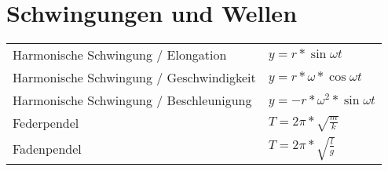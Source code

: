 \documentclass[12pt,a4paper]{paper}
\begin{document}
\section{Schwingungen und Wellen}
\begin{tabularx}{\textwidth}{X|X}
Harmonische Schwingung / Elongation & $y = r * \sin{\omega t}$\\
Harmonische Schwingung / Geschwindigkeit & $y = r * \omega * \cos{\omega t}$\\
Harmonische Schwingung / Beschleunigung & $y = -r * \omega^2 * \sin{\omega t}$\\
Federpendel & $T = 2\pi * \sqrt{\frac{m}{k}}$\\
Fadenpendel & $T= 2\pi * \sqrt{\frac{l}{g}}$\\
\end{tabularx}
\end{document}
